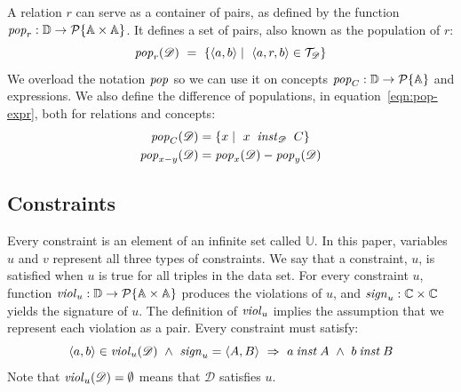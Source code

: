 \documentclass[runningheads]{llncs}
\newcommand{\id}[1]{\text{\it #1\/}}
\newcommand{\popF}[1]{\id{pop}_{#1}}
\newcommand{\pop}[2]{\popF{#1}(#2)}
\newcommand{\instance}{\mathbin{\id{inst}}}
\newcommand{\viol}[2]{\violC{#1}(#2)}
\newcommand{\violC}[1]{\id{viol}_{#1}}
\newcommand{\sign}[1]{\id{sign}_{#1}}
\newcommand{\powerset}[1]{\cal{P}\{#1\}}
\newcommand{\declare}[3]{\id{#1}_{\pair{#2}{#3}}}
\newcommand{\pair}[2]{\langle{#1},{#2}\rangle}
\newcommand{\Pair}[2]{#1\times#2}
\newcommand{\triple}[3]{\langle{#1},{#2},{#3}\rangle}
\newcommand{\Atoms}{\mathbb{A}}
\newcommand{\Concepts}{\mathbb{C}}
\newcommand{\triples}{\mathcal{T}}
\newcommand{\Constraints}{\mathbb{U}}
\newcommand{\dataset}{\mathscr{D}}
\newcommand{\Dataset}{\mathbb{D}}
\begin{document}
   A relation $r$ can serve as a container of pairs,
   as defined by the function $\popF{r}:\Dataset\rightarrow\powerset{\Pair{\Atoms}{\Atoms}}$.
   It defines a set of pairs, also known as the population of $r$:
\begin{equation}
   \pop{r}{\dataset}\ =\ \{ \pair{a}{b}\mid\ \triple{a}{r}{b}\in\triples_{\dataset}\}
\label{eqn:pop-rel}
\end{equation}
%
   We overload the notation $\popF{}$ so we can use it on concepts $\popF{C}:\Dataset\rightarrow\powerset{\Atoms}$
   and expressions. We also define the difference of populations, in equation~\ref{eqn:pop-expr}, both for relations and concepts:
\begin{align}
   \pop{C}{\dataset}&= \{ x\mid\ x\ \instance_{\dataset}\ C\}
\label{eqn:pop-concept}\\
   \pop{x-y}{\dataset}&= \pop{x}{\dataset} - \pop{y}{\dataset}
\label{eqn:pop-expr}
\end{align}

\subsection{Constraints}
\label{sct:Constraints}
   Every constraint is an element of an infinite set called $\Constraints$.
   In this paper, variables $u$ and $v$ represent all three types of constraints.
   We say that a constraint, $u$, is satisfied when $u$ is true for all triples in the data set.
   For every constraint $u$, function $\violC{u}:\Dataset\rightarrow\powerset{\Pair{\Atoms}{\Atoms}}$ produces the violations of $u$,
   and $\sign{u}:\Pair{\Concepts}{\Concepts}$ yields the signature of $u$.
   The definition of $\violC{u}$ implies the assumption that we represent each violation as a pair.
   Every constraint must satisfy:
\begin{equation}
   \pair{a}{b}\in\viol{u}{\dataset}\ \wedge\ \sign{u}=\pair{A}{B}\ \Rightarrow\ a\instance A\ \wedge\ b\instance B
\label{eqn:wellTypedViolation}
\end{equation}
   Note that $\viol{u}{\dataset}=\emptyset$ means that $\dataset$ satisfies $u$.
\end{document}
